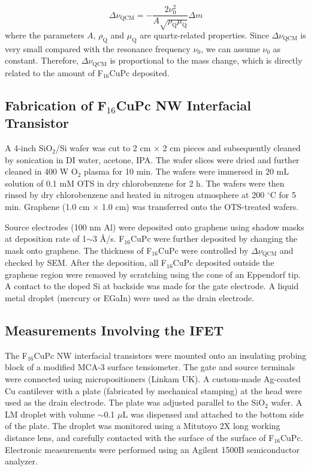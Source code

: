 \begin{equation}
\label{eq:small-1}
\Delta \nu_{\mathrm{QCM}} = -\frac{2 \nu_{0}^{2}}{A \sqrt{\rho_{\mathrm{Q}} \mu_{\mathrm{Q}}}} \Delta m
\end{equation}
where the parameters \(A\), \(\rho_{\mathrm{Q}}\) and \(\mu_{\mathrm{Q}}\)
are quartz-related properties. Since \(\Delta \nu_{\mathrm{QCM}}\) is very
small compared with the resonance frequency \(\nu_{0}\), we can assume
\(\nu_{0}\) as constant. Therefore, \(\Delta \nu_{\mathrm{QCM}}\) is
proportional to the mass change, which is directly related to the
amount of F\(_{\text{16}}\)CuPc deposited.

\subsection{Fabrication of F\(_{\text{16}}\)CuPc NW Interfacial Transistor}
\label{sec:small-orgdb060bd}

A 4-inch SiO\(_{\text{2}}\)/Si wafer was cut to 2 cm \(\times\) 2 cm pieces and subsequently
cleaned by sonication in DI water, acetone, IPA. The wafer slices were dried
and further cleaned in 400 W O\(_{\text{2}}\) plasma for 10 min. The wafers were
immersed in 20 mL solution of 0.1 mM OTS in dry chlorobenzene for 2
h. The wafers were then rinsed by dry chlorobenzene and heated in
nitrogen atmosphere at 200 \(^{\circ}\mathrm{C}\) for 5 min. Graphene
(1.0 cm \(\times\) 1.0 cm) was transferred onto the OTS-treated wafers.

Source electrodes (100 nm Al) were deposited onto graphene using
shadow masks at deposition rate of 1\(\sim\)3 \AA{}/s. F\(_{\text{16}}\)CuPc were further
deposited by changing the mask onto graphene. The thickness of
F\(_{\text{16}}\)CuPc were controlled by \(\Delta \nu_{\mathrm{QCM}}\) and checked by
SEM. After the deposition, all F\(_{\text{16}}\)CuPc deposited outside the
graphene region were removed by scratching using the cone of an
Eppendorf tip. A contact to the doped Si at backside was made for the
gate electrode. A liquid metal droplet (mercury or EGaIn) were used as
the drain electrode.

\subsection*{Measurements Involving the IFET}
\label{sec:small-orgec772cc}

The F\(_{\text{16}}\)CuPc NW interfacial transistors were mounted onto an
insulating probing block of a modified MCA-3 surface tensiometer. The
gate and source terminals were connected using micro\-positioners
(Linkam UK). A custom-made Ag-coated Cu cantilever with a plate
(fabricated by mechanical stamping) at the head were used as the drain
electrode. The plate was adjusted parallel to the SiO\(_{\text{2}}\) wafer. A LM
droplet with volume \(\sim\)0.1 \(\mu \mathrm{L}\) was dispensed and
attached to the bottom side of the plate. The droplet was monitored
using a Mitutoyo 2X long working distance lens, and carefully
contacted with the surface of the surface of F\(_{\text{16}}\)CuPc. Electronic
measurements were performed using an Agilent 1500B semiconductor
analyzer.

